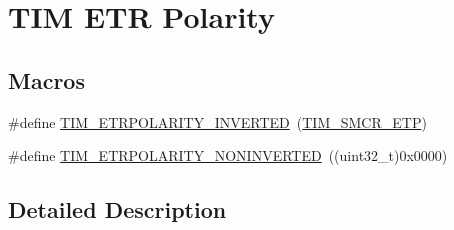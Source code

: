 \hypertarget{group___t_i_m___e_t_r___polarity}{\section{T\-I\-M E\-T\-R Polarity}
\label{group___t_i_m___e_t_r___polarity}
}
\subsection*{Macros}
\begin{DoxyCompactItemize}
\item 
\#define \hyperlink{group___t_i_m___e_t_r___polarity_ga42652ff688f0042659f8304ae08abfa6}{T\-I\-M\-\_\-\-E\-T\-R\-P\-O\-L\-A\-R\-I\-T\-Y\-\_\-\-I\-N\-V\-E\-R\-T\-E\-D}~(\hyperlink{group___peripheral___registers___bits___definition_ga2a5f335c3d7a4f82d1e91dc1511e3322}{T\-I\-M\-\_\-\-S\-M\-C\-R\-\_\-\-E\-T\-P})
\item 
\#define \hyperlink{group___t_i_m___e_t_r___polarity_ga7fa7c43245b25564414b2e191d5d8b14}{T\-I\-M\-\_\-\-E\-T\-R\-P\-O\-L\-A\-R\-I\-T\-Y\-\_\-\-N\-O\-N\-I\-N\-V\-E\-R\-T\-E\-D}~((uint32\-\_\-t)0x0000)
\end{DoxyCompactItemize}


\subsection{Detailed Description}


